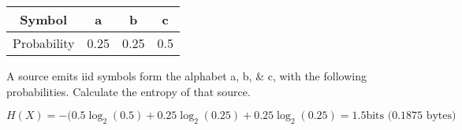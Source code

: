 \begin{question}
\begin{table}[h]
\renewcommand{\arraystretch}{1.3}
\centering
\begin{tabular}{c||c|c|c}
\hline
\bfseries Symbol & \bfseries a & b & c\\
\hline\hline	
Probability & 0.25 & 0.25 & 0.5 \\
\hline
\end{tabular}
\end{table} 

A source emits iid symbols form the alphabet {a, b, \& c}, with the following probabilities. Calculate the entropy of that source. 
\end{question}
\begin{solution}
$H(X)= -( 0.5\log_2(0.5) + 0.25\log_2(0.25) + 0.25\log_2(0.25) = 1.5 \text{bits (0.1875 bytes)}$
\end{solution}

